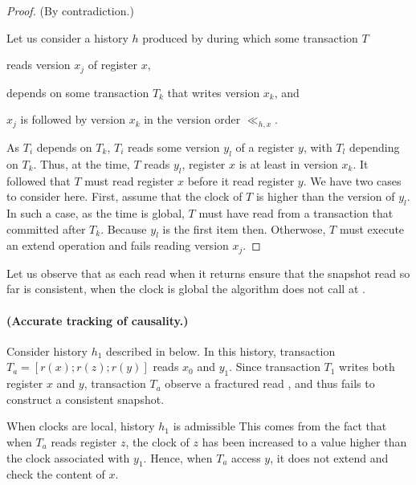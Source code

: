 \begin{proof}
  (By contradiction.)
  
  Let us consider a history $h$ produced by  during which some transaction $T$
  \begin{inparaenum}[\em(i)]
  \item reads version $x_j$ of register $x$,
  \item depends on some transaction $T_k$ that writes version $x_k$, and
  \item $x_j$ is followed by version $x_k$ in the version order $\ll_{h,x}$.
  \end{inparaenum}

  As $T_i$ depends on $T_k$, $T_i$ reads some version $y_l$ of a register $y$, with $T_l$ depending on $T_k$.
  Thus, at the time, $T$ reads $y_l$, register $x$ is at least in version $x_k$.
  It followed that $T$ must read register $x$ before it read register $y$.
  We have two cases to consider here.
  First, assume that the clock of $T$ is higher than the version of $y_l$.
  In such a case, as the time is global, $T$ must have read from a transaction that committed after $T_k$.
  Because $y_l$ is the first item then.
  Otherwose, $T$ must execute an extend operation and fails reading version $x_j$.  
\end{proof}

Let us observe that as each read when it returns ensure that the snapshot read so far is consistent, when the clock is global the algorithm does not call \stmExtend{} at .

\paragraph{(Accurate tracking of causality.)}
Consider history $h_1$ described in  below.
In this history, transaction $T_a=[r(x);r(z);r(y)]$ reads $x_0$ and $y_1$.
Since transaction $T_1$ writes both register $x$ and $y$, transaction $T_a$ observe a fractured read \cite{}, and thus fails to construct a consistent snapshot.



When clocks are local, history $h_1$ is admissible 
This comes from the fact that when $T_a$ reads register $z$, the clock of $z$ has been increased to a value higher than the clock associated with $y_1$.
Hence, when $T_a$ access $y$, it does not extend and check the content of $x$.

